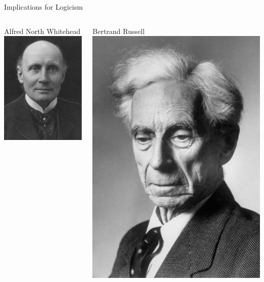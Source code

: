 \documentclass{beamer}
\begin{document}
\begin{frame}{Implications for Logicism}
  \begin{columns}[c]

    \begin{block}{Alfred North Whitehead}
      \includegraphics[height=0.35\textheight]{images/whitehead.jpg}
    \end{block}

    \begin{block}{Bertrand Russell}
      \includegraphics[height=0.35\textheight]{images/russell.jpg}
    \end{block}


\end{columns}
\end{frame}
\end{document}
